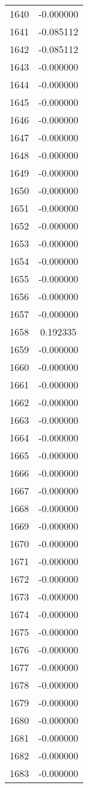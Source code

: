 \documentclass[12pt]{article}
\begin{document}
\begin{longtable}{@{}cc@{}}
1640 & -0.000000 \\
1641 & -0.085112 \\
1642 & -0.085112 \\
1643 & -0.000000 \\
1644 & -0.000000 \\
1645 & -0.000000 \\
1646 & -0.000000 \\
1647 & -0.000000 \\
1648 & -0.000000 \\
1649 & -0.000000 \\
1650 & -0.000000 \\
1651 & -0.000000 \\
1652 & -0.000000 \\
1653 & -0.000000 \\
1654 & -0.000000 \\
1655 & -0.000000 \\
1656 & -0.000000 \\
1657 & -0.000000 \\
1658 & 0.192335 \\
1659 & -0.000000 \\
1660 & -0.000000 \\
1661 & -0.000000 \\
1662 & -0.000000 \\
1663 & -0.000000 \\
1664 & -0.000000 \\
1665 & -0.000000 \\
1666 & -0.000000 \\
1667 & -0.000000 \\
1668 & -0.000000 \\
1669 & -0.000000 \\
1670 & -0.000000 \\
1671 & -0.000000 \\
1672 & -0.000000 \\
1673 & -0.000000 \\
1674 & -0.000000 \\
1675 & -0.000000 \\
1676 & -0.000000 \\
1677 & -0.000000 \\
1678 & -0.000000 \\
1679 & -0.000000 \\
1680 & -0.000000 \\
1681 & -0.000000 \\
1682 & -0.000000 \\
1683 & -0.000000 \\

\end{longtable}
\end{document}

